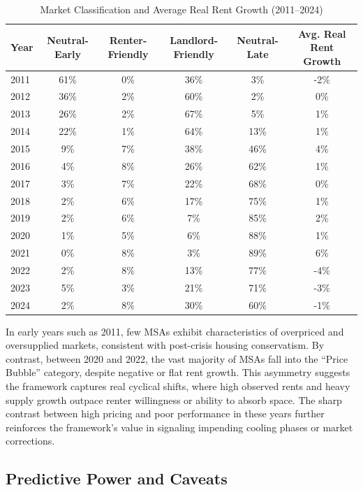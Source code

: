 \documentclass[APA,Times1COL]{WileyNJDv5} %
\begin{document}
\begin{table}[ht]
	\centering
	\caption{Market Classification and Average Real Rent Growth (2011--2024)}
	\label{tab:market_rent_growth}
	\begin{tabular}{lccccc}
		\toprule
		Year & Neutral-Early & Renter-Friendly & Landlord-Friendly & Neutral-Late & Avg. Real Rent Growth \\
		\midrule
		2011 & 61\% & 0\%  & 36\% & 3\%  & -2\% \\
		2012 & 36\% & 2\%  & 60\% & 2\%  & 0\%  \\
		2013 & 26\% & 2\%  & 67\% & 5\%  & 1\%  \\
		2014 & 22\% & 1\%  & 64\% & 13\% & 1\%  \\
		2015 & 9\%  & 7\%  & 38\% & 46\% & 4\%  \\
		2016 & 4\%  & 8\%  & 26\% & 62\% & 1\%  \\
		2017 & 3\%  & 7\%  & 22\% & 68\% & 0\%  \\
		2018 & 2\%  & 6\%  & 17\% & 75\% & 1\%  \\
		2019 & 2\%  & 6\%  & 7\%  & 85\% & 2\%  \\
		2020 & 1\%  & 5\%  & 6\%  & 88\% & 1\%  \\
		2021 & 0\%  & 8\%  & 3\%  & 89\% & 6\%  \\
		2022 & 2\%  & 8\%  & 13\% & 77\% & -4\% \\
		2023 & 5\%  & 3\%  & 21\% & 71\% & -3\% \\
		2024 & 2\%  & 8\%  & 30\% & 60\% & -1\% \\
		\bottomrule
	\end{tabular}
\end{table}


In early years such as 2011, few MSAs exhibit characteristics of overpriced and oversupplied markets, consistent with post-crisis housing conservatism. By contrast, between 2020 and 2022, the vast majority of MSAs fall into the “Price Bubble” category, despite negative or flat rent growth. This asymmetry suggests the framework captures real cyclical shifts, where high observed rents and heavy supply growth outpace renter willingness or ability to absorb space. The sharp contrast between high pricing and poor performance in these years further reinforces the framework’s value in signaling impending cooling phases or market corrections.

\subsection{Predictive Power and Caveats}
\end{document}
